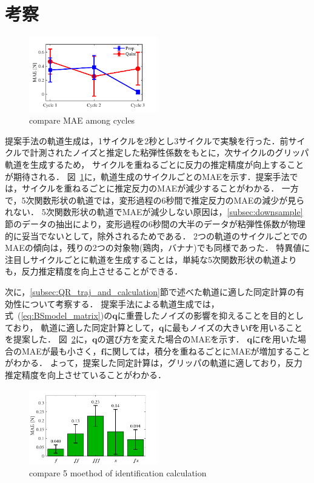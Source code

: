 \documentclass[a4paper]{jarticle}
\begin{document}
\section{考察}
\begin{figure}[htbp]
    \centering
    \includegraphics[width=0.5\textwidth]{compare_cycle_MAE.pdf}
    \caption{compare MAE among cycles}
    \label{fig:compare_cycle_MAE}
\end{figure}
提案手法の軌道生成は，1サイクルを2秒とし3サイクルで実験を行った．前サイクルで計測されたノイズと推定した粘弾性係数をもとに，次サイクルのグリッパ軌道を生成するため，
サイクルを重ねるごとに反力の推定精度が向上することが期待される．
図~\ref{fig:compare_cycle_MAE}に，軌道生成のサイクルごとのMAEを示す．提案手法では，サイクルを重ねるごとに推定反力のMAEが減少することがわかる．
一方で，5次関数形状の軌道では，変形過程の6秒間で推定反力のMAEの減少が見られない．
5次関数形状の軌道でMAEが減少しない原因は，\ref{subsec:downsample}節のデータの抽出により，変形過程の6秒間の大半のデータが粘弾性係数が物理的に妥当でないとして，除外されるためである．
2つの軌道のサイクルごとでのMAEの傾向は，残りの2つの対象物{\color{red}(鶏肉，バナナ)}でも同様であった．
特異値に注目しサイクルごとに軌道を生成することは，単純な5次関数形状の軌道よりも，反力推定精度を向上させることができる．

次に，\ref{subsec:QR_traj_and_calculation}節で述べた軌道に適した同定計算の有効性について考察する．
提案手法による軌道生成では，式~(\ref{eq:BSmodel_matrix})の$\mathbf{q}$に重畳したノイズの影響を抑えることを目的としており，
軌道に適した同定計算として，$\mathbf{q}$に最もノイズの大きい$\boldsymbol{f}$を用いることを提案した．
図~\ref{fig:compare_select5mode}に，$\mathbf{q}$の選び方を変えた場合のMAEを示す．
$\mathbf{q}$に$\boldsymbol{f}$を用いた場合のMAEが最も小さく，$\boldsymbol{{f}}$に関しては，積分を重ねるごとにMAEが増加することがわかる．
よって，提案した同定計算は，グリッパの軌道に適しており，反力推定精度を向上させていることがわかる．
\begin{figure}[htbp]
    \centering
    \includegraphics[width=0.5\textwidth]{select_different_q.pdf}
    \captionsetup{width=0.9\linewidth} %
    \caption{compare 5 moethod of identification calculation}
    \label{fig:compare_select5mode}
\end{figure}
\end{document}
